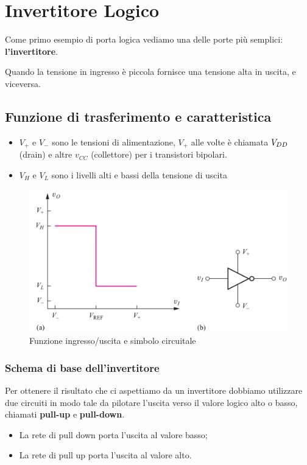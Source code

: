\chapter{Invertitore Logico}
Come primo esempio di porta logica vediamo una delle porte più semplici: \textbf{l'invertitore}.

Quando la tensione in ingresso è piccola fornisce una tensione alta in uscita, e viceversa.

\section{Funzione di trasferimento e caratteristica}

\begin{itemize}
    \item $V_+$ e $V_-$ sono le tensioni di	alimentazione, $V_+$ alle volte è chiamata $V_{DD}$ (drain) e altre $v_{CC}$ (collettore) per i transistori bipolari.
    \item $V_H$ e $V_L$ sono i livelli alti e	bassi	della	tensione	di	uscita
\end{itemize}

\begin{figure}[htbp]
    \centering
    \includegraphics[width=0.75\linewidth]{img/inverter.png}
    \caption{Funzione ingresso/uscita e simbolo circuitale}    
\end{figure}

\subsection{Schema di base dell'invertitore}

Per ottenere il risultato che ci aspettiamo da un invertitore dobbiamo utilizzare due circuiti in modo tale da pilotare l'uscita verso il valore logico alto o basso, chiamati \textbf{pull-up} e \textbf{pull-down}.

\begin{itemize}
    \item[] La	rete	di	pull	down	porta	l’uscita	al	valore	basso;
    \item[] La	rete	di	pull	up	porta	l’uscita	al	valore	alto.
\end{itemize}

